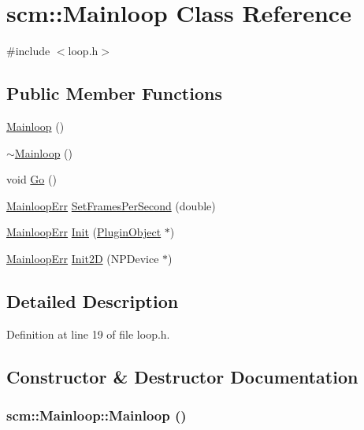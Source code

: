 \hypertarget{classscm_1_1_mainloop}{
\section{scm::Mainloop Class Reference}
\label{classscm_1_1_mainloop}
}


{\ttfamily \#include $<$loop.h$>$}

\subsection*{Public Member Functions}
\begin{DoxyCompactItemize}
\item 
\hyperlink{classscm_1_1_mainloop_abacbb3c174abded439ddf745e840dd29}{Mainloop} ()
\item 
\hyperlink{classscm_1_1_mainloop_a0638591ae4a2df7e99d2ba586ad5edfe}{$\sim$Mainloop} ()
\item 
void \hyperlink{classscm_1_1_mainloop_a7e332605f463847553999278a975d650}{Go} ()
\item 
\hyperlink{namespacescm_aec9fbdb87d677e6e822d612ed3e3a20b}{MainloopErr} \hyperlink{classscm_1_1_mainloop_a47a4747a4529b29b2337942496bc4e61}{SetFramesPerSecond} (double)
\item 
\hyperlink{namespacescm_aec9fbdb87d677e6e822d612ed3e3a20b}{MainloopErr} \hyperlink{classscm_1_1_mainloop_a3b4177ac538fb42bc7bed6bb5e84a6dc}{Init} (\hyperlink{class_plugin_object}{PluginObject} $\ast$)
\item 
\hyperlink{namespacescm_aec9fbdb87d677e6e822d612ed3e3a20b}{MainloopErr} \hyperlink{classscm_1_1_mainloop_ab4e2e2a9df321c2761d24690a503cc06}{Init2D} (NPDevice $\ast$)
\end{DoxyCompactItemize}


\subsection{Detailed Description}


Definition at line 19 of file loop.h.



\subsection{Constructor \& Destructor Documentation}
\hypertarget{classscm_1_1_mainloop_abacbb3c174abded439ddf745e840dd29}{
\subsubsection[{Mainloop}]{\setlength{\rightskip}{0pt plus 5cm}scm::Mainloop::Mainloop ()}}
\label{classscm_1_1_mainloop_abacbb3c174abded439ddf745e840dd29}


